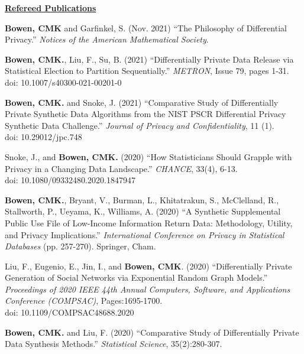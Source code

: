 \documentclass[11pt, letterpaper, roman]{moderncv} %
\begin{document}
\vspace{6pt}
\noindent\underline{\textbf{Refereed Publications}}
\vspace{4pt}
\begin{etaremune}[topsep=0pt, itemsep=6pt, partopsep=0pt, parsep=0pt]
    \item \textbf{Bowen, CMK} and Garfinkel, S. (Nov. 2021) ``The Philosophy of Differential Privacy.'' \textit{Notices of the American Mathematical Society}.
    
    \item \textbf{Bowen, CMK.}, Liu, F., Su, B. (2021) ``Differentially Private Data Release via Statistical Election to Partition Sequentially.'' \textit{METRON}, Issue 79, pages 1-31.\\
    doi: 10.1007/s40300-021-00201-0
    
    \item \textbf{Bowen, CMK.} and Snoke, J. (2021) ``Comparative Study of Differentially Private Synthetic Data Algorithms from the NIST PSCR Differential Privacy Synthetic Data Challenge.'' \textit{Journal of Privacy and Confidentiality}, 11 (1).\\
    doi: 10.29012/jpc.748
    
    \item Snoke, J., and \textbf{Bowen, CMK.} (2020) ``How Statisticians Should Grapple with Privacy in a Changing Data Landscape.'' \textit{CHANCE}, 33(4), 6-13.\\
    doi: 10.1080/09332480.2020.1847947
    
    \item \textbf{Bowen, CMK.}, Bryant, V., Burman, L., Khitatrakun, S., McClelland, R., Stallworth, P., Ueyama, K., Williams, A. (2020) ``A Synthetic Supplemental Public Use File of Low-Income Information Return Data: Methodology, Utility, and Privacy Implications.'' \textit{International Conference on Privacy in Statistical Databases} (pp. 257-270). Springer, Cham.
    
    \item Liu, F., Eugenio, E., Jin, I., and \textbf{Bowen, CMK}. (2020) ``Differentially Private Generation of Social Networks via Exponential Random Graph Models.'' \textit{Proceedings of 2020 IEEE 44th Annual Computers, Software, and Applications Conference (COMPSAC)}, Pages:1695-1700.\\
    doi: 10.1109/COMPSAC48688.2020

    \item \textbf{Bowen, CMK.} and Liu, F. (2020) ``Comparative Study of Differentially Private Data Synthesis Methods.'' \textit{Statistical Science}, 35(2):280-307.


\end{etaremune}
\end{document}
